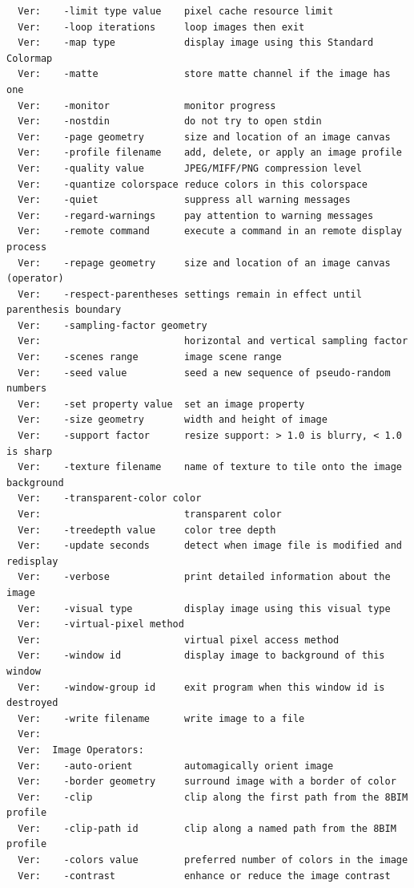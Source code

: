 \documentclass[11pt]{article}
\begin{document}
\begin{verbatim}
  Ver:    -limit type value    pixel cache resource limit
  Ver:    -loop iterations     loop images then exit
  Ver:    -map type            display image using this Standard Colormap
  Ver:    -matte               store matte channel if the image has one
  Ver:    -monitor             monitor progress
  Ver:    -nostdin             do not try to open stdin
  Ver:    -page geometry       size and location of an image canvas
  Ver:    -profile filename    add, delete, or apply an image profile
  Ver:    -quality value       JPEG/MIFF/PNG compression level
  Ver:    -quantize colorspace reduce colors in this colorspace
  Ver:    -quiet               suppress all warning messages
  Ver:    -regard-warnings     pay attention to warning messages
  Ver:    -remote command      execute a command in an remote display process
  Ver:    -repage geometry     size and location of an image canvas (operator)
  Ver:    -respect-parentheses settings remain in effect until parenthesis boundary
  Ver:    -sampling-factor geometry
  Ver:                         horizontal and vertical sampling factor
  Ver:    -scenes range        image scene range
  Ver:    -seed value          seed a new sequence of pseudo-random numbers
  Ver:    -set property value  set an image property
  Ver:    -size geometry       width and height of image
  Ver:    -support factor      resize support: > 1.0 is blurry, < 1.0 is sharp
  Ver:    -texture filename    name of texture to tile onto the image background
  Ver:    -transparent-color color
  Ver:                         transparent color
  Ver:    -treedepth value     color tree depth
  Ver:    -update seconds      detect when image file is modified and redisplay
  Ver:    -verbose             print detailed information about the image
  Ver:    -visual type         display image using this visual type
  Ver:    -virtual-pixel method
  Ver:                         virtual pixel access method
  Ver:    -window id           display image to background of this window
  Ver:    -window-group id     exit program when this window id is destroyed
  Ver:    -write filename      write image to a file
  Ver:  
  Ver:  Image Operators:
  Ver:    -auto-orient         automagically orient image
  Ver:    -border geometry     surround image with a border of color
  Ver:    -clip                clip along the first path from the 8BIM profile
  Ver:    -clip-path id        clip along a named path from the 8BIM profile
  Ver:    -colors value        preferred number of colors in the image
  Ver:    -contrast            enhance or reduce the image contrast

\end{verbatim}
\end{document}
